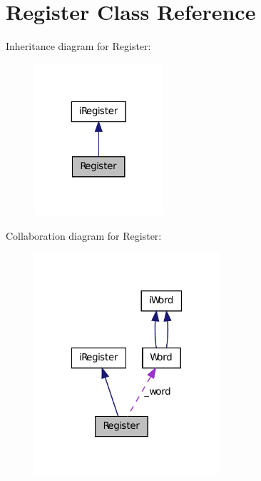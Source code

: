\hypertarget{classRegister}{
\section{Register Class Reference}
\label{classRegister}
}


Inheritance diagram for Register:
\nopagebreak
\begin{figure}[H]
\begin{center}
\leavevmode
\includegraphics[width=136pt]{classRegister__inherit__graph}
\end{center}
\end{figure}


Collaboration diagram for Register:
\nopagebreak
\begin{figure}[H]
\begin{center}
\leavevmode
\includegraphics[width=195pt]{classRegister__coll__graph}
\end{center}
\end{figure}

